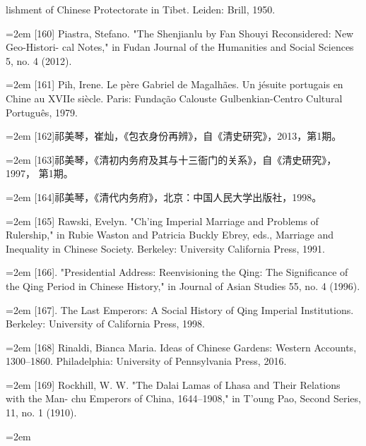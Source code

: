 lishment of Chinese Protectorate in Tibet. Leiden: Brill, 1950.%
\par
\noindent\hangindent=2em
[160] Piastra, Stefano. "The Shenjianlu by Fan Shouyi Reconsidered: New Geo-Histori-%
cal Notes," in Fudan Journal of the Humanities and Social Sciences 5, no. 4 (2012).%
\par
\noindent\hangindent=2em
[161] Pih, Irene. Le père Gabriel de Magalhães. Un jésuite portugais en Chine au XVIIe%
\space%
siècle. Paris: Fundação Calouste Gulbenkian-Centro Cultural Português, 1979.%
\par
\noindent\hangindent=2em
[162]祁美琴，崔灿，《包衣身份再辨》，自《清史研究》，2013，第1期。%
\par
\noindent\hangindent=2em
[163]祁美琴，《清初内务府及其与十三衙门的关系》，自《清史研究》，1997，%
第1期。%
\par
\noindent\hangindent=2em
[164]祁美琴，《清代内务府》，北京：中国人民大学出版社，1998。%
\par
\noindent\hangindent=2em
[165] Rawski, Evelyn. "Ch'ing Imperial Marriage and Problems of Rulership," in Rubie%
\space%
Waston and Patricia Buckly Ebrey, eds., Marriage and Inequality in Chinese%
\space%
Society. Berkeley: University California Press, 1991.%
\par
\noindent\hangindent=2em
[166]. "Presidential Address: Reenvisioning the Qing: The Significance of the%
\space%
Qing Period in Chinese History," in Journal of Asian Studies 55, no. 4 (1996).%
\par
\noindent\hangindent=2em
[167]. The Last Emperors: A Social History of Qing Imperial Institutions. Berkeley:%
\space%
University of California Press, 1998.%
\par
\noindent\hangindent=2em
[168] Rinaldi, Bianca Maria. Ideas of Chinese Gardens: Western Accounts, 1300–1860.%
\space%
Philadelphia: University of Pennsylvania Press, 2016.%
\par
\noindent\hangindent=2em
[169] Rockhill, W. W. "The Dalai Lamas of Lhasa and Their Relations with the Man-%
chu Emperors of China, 1644–1908," in T’oung Pao, Second Series, 11, no. 1%
(1910).%
\par
\noindent\hangindent=2em
